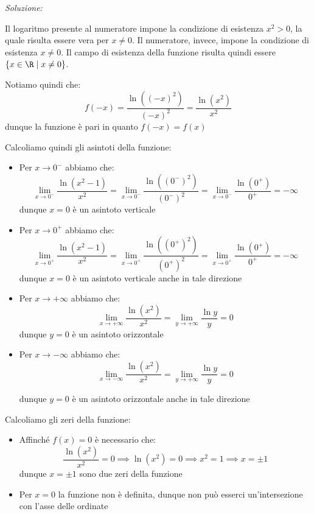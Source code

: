 \documentclass[a4paper, 12pt]{report}
\begin{document}
    \textit{Soluzione:}

    Il logaritmo presente al numeratore impone la condizione di esistenza $x^2 > 0$, la quale risulta essere vera per $x \neq 0$. Il numeratore, invece, impone la condizione di esistenza $x \neq 0$. Il campo di esistenza della funzione risulta quindi essere $\{x \in \R \mid x \neq 0\}$.

    Notiamo quindi che:
    \[f(-x) = \frac{\ln((-x)^2)}{(-x)^2} = \dfrac{\ln(x^2)}{x^2}\]
    dunque la funzione è pari in quanto $f(-x) = f(x)$

    Calcoliamo quindi gli asintoti della funzione:
    \begin{itemize}
        \item Per $x \to 0^-$ abbiamo che:
        \[\lim_{x \to 0^-} \dfrac{\ln(x^2-1)}{x^2} = \lim_{x \to 0^-} \dfrac{\ln((0^-)^2)}{(0^-)^2} = \lim_{x \to 0^-} \dfrac{\ln(0^+)}{0^+} = -\infty\]
        dunque $x = 0$ è un asintoto verticale

        \item Per $x \to 0^+$ abbiamo che:
        \[\lim_{x \to 0^+} \dfrac{\ln(x^2-1)}{x^2} = \lim_{x \to 0^+} \dfrac{\ln((0^+)^2)}{(0^+)^2} = \lim_{x \to 0^+} \dfrac{\ln(0^+)}{0^+} = -\infty\]
        dunque $x = 0$ è un asintoto verticale anche in tale direzione

        \item Per $x \to +\infty$ abbiamo che:
        \[\lim_{x \to +\infty} \dfrac{\ln(x^2)}{x^2} = \lim_{y \to +\infty} \dfrac{\ln y}{y} = 0\]
        dunque $y = 0$ è un asintoto orizzontale

        \item Per $x \to -\infty$ abbiamo che:
        \[\lim_{x \to -\infty} \dfrac{\ln(x^2)}{x^2} = \lim_{y \to +\infty} \dfrac{\ln y}{y} = 0\]

        dunque $y = 0$ è un asintoto orizzontale anche in tale direzione
    \end{itemize}

    \newpage

    Calcoliamo gli zeri della funzione:
    \begin{itemize}
        \item Affinché $f(x) = 0$ è necessario che:
        \[\dfrac{\ln(x^2)}{x^2} = 0 \implies \ln(x^2) = 0 \implies x^2 = 1 \implies x = \pm 1\]
        dunque $x = \pm 1$ sono due zeri della funzione
        \item Per $x = 0$ la funzione non è definita, dunque non può esserci un'intersezione con l'asse delle ordinate
    \end{itemize}
\end{document}
